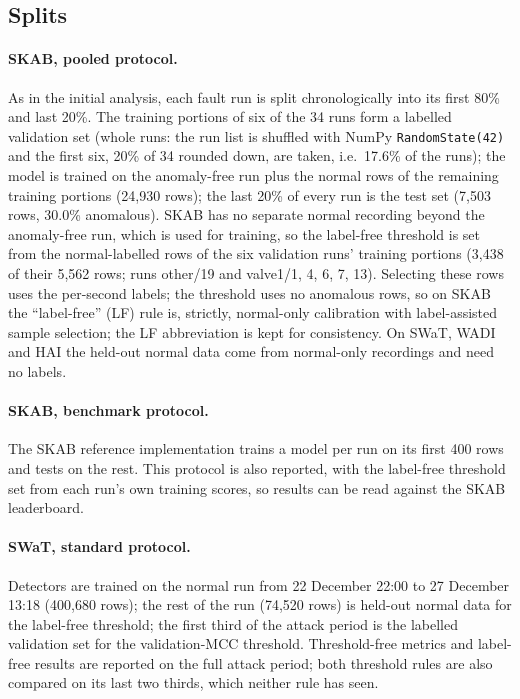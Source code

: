 \documentclass[11pt]{article}
\begin{document}
\subsection{Splits}
\paragraph{SKAB, pooled protocol.} As in the initial analysis, each fault run is
split chronologically into its first 80\% and last 20\%. The training portions of
six of the 34 runs form a labelled validation set (whole runs: the run list is shuffled
with NumPy \texttt{RandomState(42)} and the first six, 20\% of 34 rounded
down, are taken, i.e.\ 17.6\% of the runs); the
model is trained on the anomaly-free run plus the normal rows of the remaining
training portions (24{,}930 rows); the last 20\% of every run is the test set (7{,}503 rows,
30.0\% anomalous). SKAB has no separate normal recording beyond the anomaly-free run,
which is used for training, so the label-free threshold is set from the normal-labelled
rows of the six validation runs' training portions (3{,}438 of their 5{,}562 rows; runs
other/19 and valve1/1, 4, 6, 7, 13). Selecting these rows uses the per-second labels; the
threshold uses no anomalous rows, so on SKAB the ``label-free'' (LF) rule is, strictly,
normal-only calibration with label-assisted sample selection; the LF abbreviation is kept
for consistency. On
SWaT, WADI and HAI the held-out normal data come from normal-only recordings and need no
labels.
\paragraph{SKAB, benchmark protocol.} The SKAB reference implementation trains
a model per run on its first 400 rows and tests on the rest. This protocol is
also reported, with the label-free threshold set from each run's own training
scores, so results can be read against the SKAB leaderboard.
\paragraph{SWaT, standard protocol.} Detectors are trained on the normal run
from 22 December 22:00 to 27 December 13:18 (400{,}680 rows); the rest of the run
(74{,}520 rows) is held-out normal data
for the label-free threshold; the first third of the attack period is the
labelled validation set for the validation-MCC threshold. Threshold-free metrics
and label-free results are reported on the full attack period; both threshold
rules are also compared on its last two thirds, which neither rule has seen.
\end{document}

